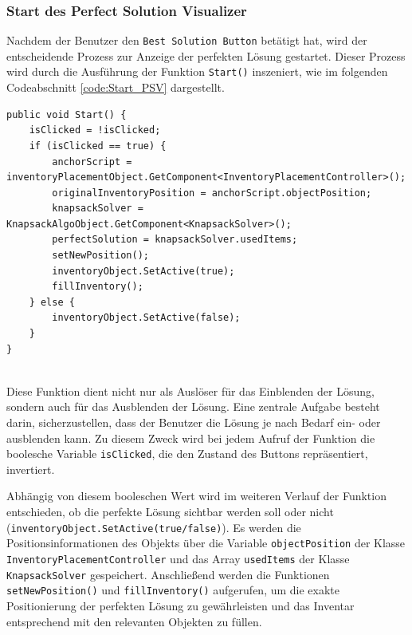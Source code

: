 \subsubsection{Start des Perfect Solution Visualizer}
Nachdem der Benutzer den \texttt{Best Solution Button} betätigt hat, wird der entscheidende Prozess zur Anzeige der perfekten
Lösung gestartet. Dieser Prozess wird durch die Ausführung der Funktion \texttt{Start()} inszeniert, wie im folgenden
Codeabschnitt \ref{code:Start_PSV} dargestellt.
\begin{lstlisting}[style=csharp, caption={PerfectSolutionVisualizer Start}, label=code:Start_PSV]
public void Start() {
    isClicked = !isClicked;
    if (isClicked == true) {
        anchorScript = inventoryPlacementObject.GetComponent<InventoryPlacementController>();
        originalInventoryPosition = anchorScript.objectPosition;
        knapsackSolver = KnapsackAlgoObject.GetComponent<KnapsackSolver>();
        perfectSolution = knapsackSolver.usedItems;
        setNewPosition();
        inventoryObject.SetActive(true);
        fillInventory();
    } else {
        inventoryObject.SetActive(false);
    }
}
\end{lstlisting}\\
Diese Funktion dient nicht nur als Auslöser für das Einblenden der Lösung, sondern auch für das Ausblenden der Lösung.
Eine zentrale Aufgabe besteht darin, sicherzustellen, dass der Benutzer die Lösung je nach Bedarf ein- oder ausblenden
kann. Zu diesem Zweck wird bei jedem Aufruf der Funktion die boolesche Variable \texttt{isClicked}, die den Zustand des
Buttons repräsentiert, invertiert.

Abhängig von diesem booleschen Wert wird im weiteren Verlauf der Funktion entschieden, ob die perfekte Lösung sichtbar
werden soll oder nicht (\texttt{inventoryObject.SetActive(true/false)}). Es werden die Positionsinformationen des Objekts
über die Variable \texttt{objectPosition} der Klasse \texttt{InventoryPlacementController} und das Array \texttt{usedItems}
der Klasse \texttt{KnapsackSolver} gespeichert. Anschließend werden die Funktionen \texttt{setNewPosition()} und
\texttt{fillInventory()} aufgerufen, um die exakte Positionierung der perfekten Lösung zu gewährleisten und das Inventar
entsprechend mit den relevanten Objekten zu füllen.

